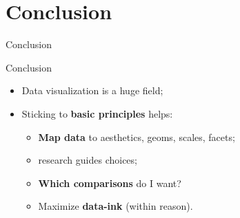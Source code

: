 \documentclass[xcolor=table,aspectratio=169]{beamer}
\begin{document}
\section{Conclusion}


\begin{frame}


  Conclusion  
\end{frame}

\begin{frame}{Conclusion}

  \begin{itemize}
    \item Data visualization is a huge field;
    \item Sticking to \textbf{basic principles} helps:
      \begin{itemize}
      \item \textbf{Map data} to aesthetics, geoms, scales, facets;
    \item {} research  guides choices;
      \item \textbf{Which comparisons} do I want?
          \item Maximize \textbf{data-ink} (within reason).
          \end{itemize}
  \end{itemize}
\end{frame}
\end{document}
